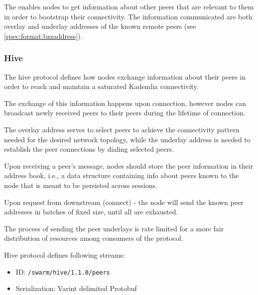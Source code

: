 The  enables nodes to get information about other peers that are relevant to them in order to bootstrap their connectivity. The information communicated are both overlay and underlay addresses of the known remote peers (see  \ref{spec:format:bzzaddress}). %

\subsubsection{Hive}

The hive protocol defines how nodes exchange information about their peers in order to reach and maintain a saturated Kademlia connectivity.

The exchange of this information happens upon connection, however nodes can broadcast newly received peers to their peers during the lifetime of connection.



The overlay address serves to select peers to achieve the connectivity pattern needed for the desired network topology, while the underlay address is needed to establish the peer connections by dialing selected peers.

Upon receiving a peer's message, nodes should store the peer information in their address book, i.e., a data structure containing info about peers known to the node that is meant to be persisted across sessions.

Upon request from downstream (connect) - the node will send the known
peer addresses in batches of fixed size, until all are exhausted.

The process of sending the peer underlays is rate limited for a more
fair distribution of resources among consumers of the protocol.

Hive protocol defines following streams:

\begin{itemize}
    \item ID: \texttt{/swarm/hive/1.1.0/peers}
    \item Serialization: Varint delimited Protobuf
\end{itemize}

